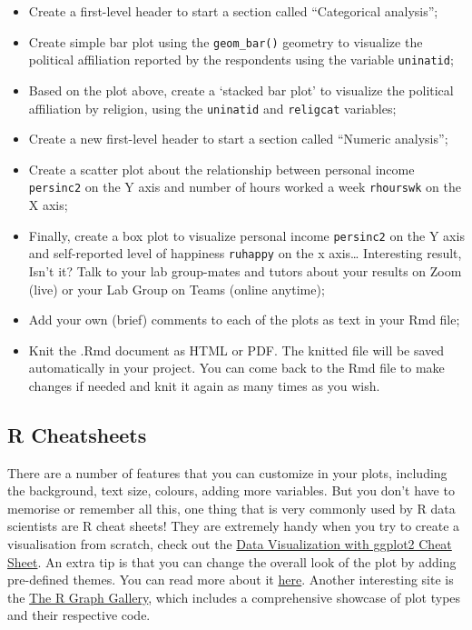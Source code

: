 \documentclass[
]{book}
\providecommand{\tightlist}{%
  \setlength{\itemsep}{0pt}\setlength{\parskip}{0pt}}
\begin{document}
\begin{itemize}
\tightlist
\item
  Create a first-level header to start a section called ``Categorical analysis'';
\item
  Create simple bar plot using the \texttt{geom\_bar()} geometry to visualize the political affiliation reported by the respondents using the variable \texttt{uninatid};
\item
  Based on the plot above, create a `stacked bar plot' to visualize the political affiliation by religion, using the \texttt{uninatid} and \texttt{religcat} variables;
\item
  Create a new first-level header to start a section called ``Numeric analysis'';
\item
  Create a scatter plot about the relationship between personal income \texttt{persinc2} on the Y axis and number of hours worked a week \texttt{rhourswk} on the X axis;
\item
  Finally, create a box plot to visualize personal income \texttt{persinc2} on the Y axis and self-reported level of happiness \texttt{ruhappy} on the x axis\ldots{} Interesting result, Isn't it? Talk to your lab group-mates and tutors about your results on Zoom (live) or your Lab Group on Teams (online anytime);
\item
  Add your own (brief) comments to each of the plots as text in your Rmd file;
\item
  Knit the .Rmd document as HTML or PDF. The knitted file will be saved automatically in your project. You can come back to the Rmd file to make changes if needed and knit it again as many times as you wish.
\end{itemize}

\hypertarget{r-cheatsheets}{%
\subsection{R Cheatsheets}\label{r-cheatsheets}}

There are a number of features that you can customize in your plots, including the background, text size, colours, adding more variables. But you don't have to memorise or remember all this, one thing that is very commonly used by R data scientists are R cheat sheets! They are extremely handy when you try to create a visualisation from scratch, check out the \href{https://rstudio.com/wp-content/uploads/2015/03/ggplot2-cheatsheet.pdf}{Data Visualization with ggplot2 Cheat Sheet}. An extra tip is that you can change the overall look of the plot by adding pre-defined themes. You can read more about it \href{https://ggplot2.tidyverse.org/reference/ggtheme.html}{here}. Another interesting site is the \href{https://www.r-graph-gallery.com/}{The R Graph Gallery}, which includes a comprehensive showcase of plot types and their respective code.
\end{document}
